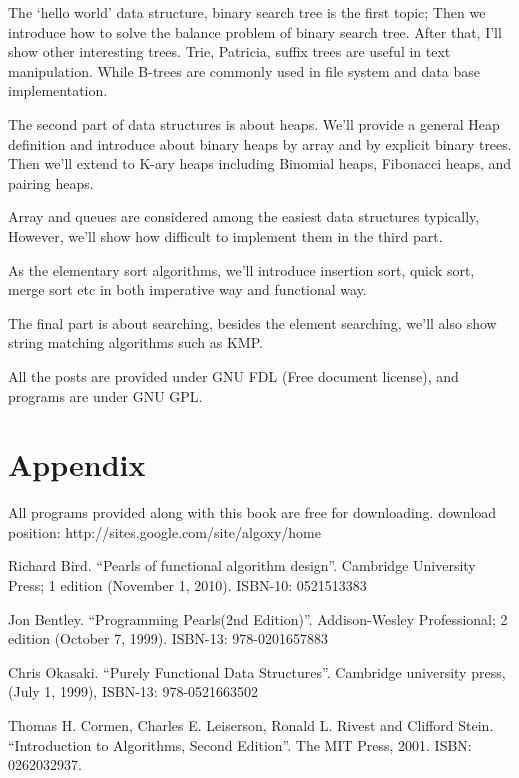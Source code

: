 \documentclass[UTF8]{article}
\begin{document}
The `hello world' data structure, binary search tree is the
first topic; Then we introduce how to solve the balance problem
of binary search tree. After that, I'll show other interesting
trees. Trie, Patricia, suffix trees are useful in text manipulation.
While B-trees are commonly used in file system and data base
implementation.

The second part of data structures is about heaps. We'll
provide a general Heap definition and introduce about binary
heaps by array and by explicit binary trees. Then we'll
extend to K-ary heaps including Binomial heaps, Fibonacci
heaps, and pairing heaps.

Array and queues are considered among the easiest data structures
typically, However, we'll show how difficult to implement
them in the third part.

As the elementary sort algorithms, we'll introduce insertion
sort, quick sort, merge sort etc in both imperative way
and functional way.

The final part is about searching, besides the element
searching, we'll also show string matching algorithms
such as KMP.

All the posts are provided under GNU FDL (Free document
license), and programs are under GNU GPL.

\section{Appendix} \label{appendix}
All programs provided along with this book are free for
downloading. download position:
  http://sites.google.com/site/algoxy/home

\begin{thebibliography}{99}

Richard Bird. ``Pearls of functional algorithm design''. Cambridge University Press; 1 edition (November 1, 2010). ISBN-10: 0521513383

Jon Bentley. ``Programming Pearls(2nd Edition)''. Addison-Wesley Professional; 2 edition (October 7, 1999). ISBN-13: 978-0201657883

Chris Okasaki. ``Purely Functional Data Structures''. Cambridge university press, (July 1, 1999), ISBN-13: 978-0521663502

Thomas H. Cormen, Charles E. Leiserson, Ronald L. Rivest and Clifford Stein. ``Introduction to Algorithms, Second Edition''. The MIT Press, 2001. ISBN: 0262032937.

\end{thebibliography}

\ifx\wholebook\relax \else
\end{document}
